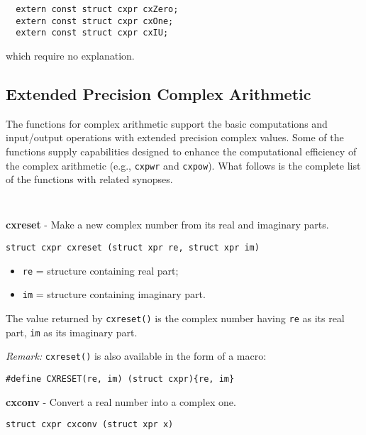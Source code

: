 \documentclass{article}
\begin{document}
\begin{verbatim}
  extern const struct cxpr cxZero;
  extern const struct cxpr cxOne;
  extern const struct cxpr cxIU;
\end{verbatim}
which require no explanation.

\hypertarget{toc14}{}
\subsection{Extended Precision Complex Arithmetic}
The functions for complex arithmetic support the basic computations
and input/output operations with extended precision complex values.
Some of the functions supply capabilities designed to enhance the 
computational efficiency of the complex arithmetic (e.g., \texttt{cxpwr} and \texttt{cxpow}). 
What follows is the complete list of the functions 
with related synopses.

\begin{verbatim}
   
\end{verbatim}

\textbf{cxreset} - Make a new complex number from its real
and imaginary parts.

\begin{verbatim}
struct cxpr cxreset (struct xpr re, struct xpr im)
\end{verbatim}

\begin{itemize}
\item \texttt{re} = structure containing real part;
\item \texttt{im} = structure containing imaginary part.
\end{itemize}

The value returned by \texttt{cxreset()} is the complex
number having \texttt{re} as its real part, \texttt{im}
as its imaginary part.

\textit{Remark:}
\texttt{cxreset()} is also available in the form of a macro:

\begin{verbatim}
#define CXRESET(re, im) (struct cxpr){re, im}
\end{verbatim}

\hrulefill{}

\textbf{cxconv} - Convert a real number into a complex one.

\begin{verbatim}
struct cxpr cxconv (struct xpr x)
\end{verbatim}
\end{document}
